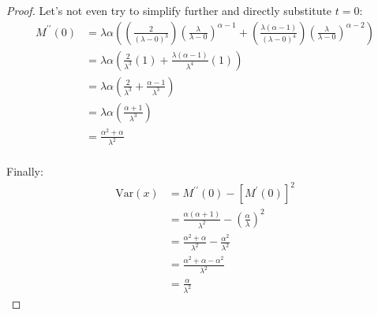 \documentclass[12pt]{article}
\begin{document}
\begin{proof}
	Let's not even try to simplify further and directly substitute $t=0$:\vspace*{-12pt}
	\begin{equation}
		\begin{split}
			M^{\prime\prime}(0)	&=	\lambda\alpha\left(\left(\frac{2}{(\lambda-0)^3}\right)\left(\frac{\lambda}{\lambda - 0}\right)^{\alpha-1} + \left(\frac{\lambda(\alpha-1)}{(\lambda - 0)^4}\right)\left(\frac{\lambda}{\lambda-0}\right)^{\alpha-2}\right)\\
								&=	\lambda\alpha\left(\frac{2}{\lambda^3}(1) + \frac{\lambda(\alpha-1)}{\lambda^4}(1)\right)\\
								&=	\lambda\alpha\left(\frac{2}{\lambda^3} + \frac{\alpha-1}{\lambda^3}\right)\\
								&=	\lambda\alpha\left(\frac{\alpha+1}{\lambda^3}\right)\\
								&=	\frac{\alpha^2 + \alpha}{\lambda^2}
		\end{split}
	\end{equation}\\[-30pt]
	Finally:\vspace*{-12pt}
	\begin{equation}
		\begin{split}
			\text{Var}(x)	&=	 M^{\prime\prime}(0) - [M^\prime(0)]^2\\
							&=	\frac{\alpha(\alpha+1)}{\lambda^2} - \left(\frac{\alpha}{\lambda}\right)^2\\
							&=	\frac{\alpha^2+\alpha}{\lambda^2} - \frac{\alpha^2}{\lambda^2}\\
							&=	\frac{\alpha^2 + \alpha -\alpha^2}{\lambda^2}\\
							&=	\frac{\alpha}{\lambda^2}
		\end{split}
	\end{equation}
\end{proof}
\end{document}
